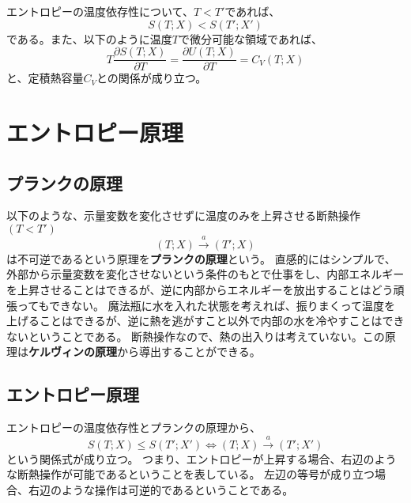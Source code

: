\documentclass[a4paper]{jsreport}
\begin{document}
                エントロピーの温度依存性について、$T < T'$であれば、
                \begin{equation}
                    S(T; X) < S(T'; X')
                \end{equation}
                である。また、以下のように温度$T$で微分可能な領域であれば、
                \begin{equation}
                    T \frac{\partial S(T; X)}{\partial T} = \frac{\partial U(T; X)}{\partial T} = C_V(T; X)
                \end{equation}
                と、定積熱容量$C_V$との関係が成り立つ。


        \section{エントロピー原理}
            \subsection*{プランクの原理}
                以下のような、示量変数を変化させずに温度のみを上昇させる断熱操作$(T < T')$
                \begin{equation} \label{eq:5e}
                    (T; X) \xrightarrow{a} (T'; X)
                \end{equation}
                は不可逆であるという原理を\textbf{プランクの原理}という。
                直感的にはシンプルで、外部から示量変数を変化させないという条件のもとで仕事をし、内部エネルギーを上昇させることはできるが、逆に内部からエネルギーを放出することはどう頑張ってもできない。
                魔法瓶に水を入れた状態を考えれば、振りまくって温度を上げることはできるが、逆に熱を逃がすこと以外で内部の水を冷やすことはできないということである。
                断熱操作なので、熱の出入りは考えていない。この原理は\textbf{ケルヴィンの原理}から導出することができる。

            \subsection*{エントロピー原理}
                エントロピーの温度依存性とプランクの原理から、
                \begin{equation}
                    S(T; X) \le S(T'; X') \Longleftrightarrow (T; X) \xrightarrow{a} (T'; X')
                \end{equation}
                という関係式が成り立つ。
                つまり、エントロピーが上昇する場合、右辺のような断熱操作が可能であるということを表している。
                左辺の等号が成り立つ場合、右辺のような操作は可逆的であるということである。
\end{document}
